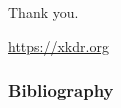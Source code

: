 \documentclass[aspectratio=169]{beamer} %
\begin{document}
        \begin{frame}
          \hfill {\LARGE Thank you}.
          
          \vfill
          \vfill
          
          \hfill \url{https://xkdr.org}
        \end{frame}

        \begin{frame}[allowframebreaks]
          \frametitle{Bibliography}
          \renewcommand*{\bibfont}{\scriptsize}\printbibliography
        \end{frame}
        
\end{document}
